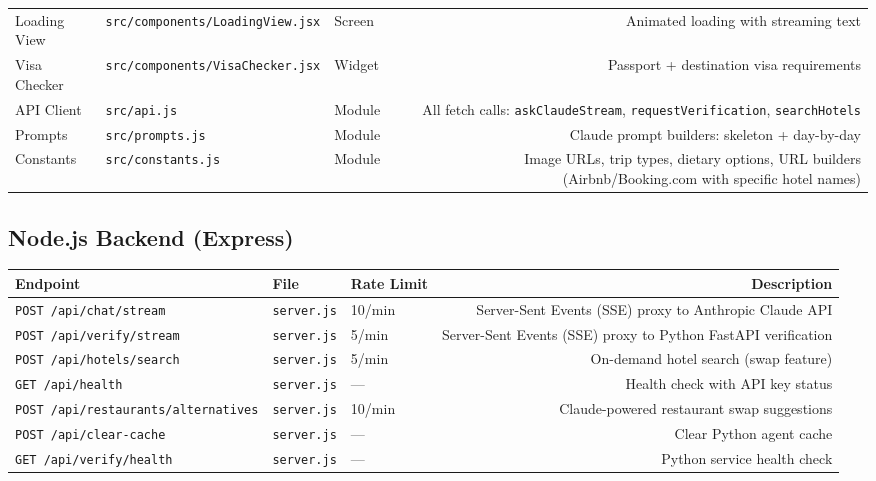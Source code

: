 \documentclass[11pt,a4paper]{article}
\begin{document}
{\begin{tabularx}{\textwidth}{@{}L{2.6cm}L{3.8cm}L{1.4cm}R@{}}
Loading View     & \texttt{src/components/\allowbreak LoadingView.jsx} & Screen   & Animated loading with streaming text \\[4pt]
Visa Checker     & \texttt{src/components/\allowbreak VisaChecker.jsx} & Widget   & Passport + destination visa requirements \\[4pt]
API Client       & \texttt{src/api.js}             & Module   & All fetch calls: \texttt{askClaudeStream}, \texttt{requestVerification}, \texttt{searchHotels} \\[4pt]
Prompts          & \texttt{src/prompts.js}          & Module   & Claude prompt builders: skeleton + day-by-day \\[4pt]
Constants        & \texttt{src/constants.js}         & Module   & Image URLs, trip types, dietary options, URL builders (Airbnb/Booking.com with specific hotel names) \\
\bottomrule
\end{tabularx}}

\subsection{Node.js Backend (Express)}

{\small
\begin{tabularx}{\textwidth}{@{}L{3.8cm}L{2.4cm}L{2cm}R@{}}
\toprule
\textbf{Endpoint} & \textbf{File} & \textbf{Rate Limit} & \textbf{Description} \\
\midrule
\texttt{POST /api/chat/\allowbreak stream} & \texttt{server.js} & 10/min & Server-Sent Events (SSE) proxy to Anthropic Claude API \\[4pt]
\texttt{POST /api/verify/\allowbreak stream} & \texttt{server.js} & 5/min & Server-Sent Events (SSE) proxy to Python FastAPI verification \\[4pt]
\texttt{POST /api/hotels/\allowbreak search} & \texttt{server.js} & 5/min & On-demand hotel search (swap feature) \\[4pt]
\texttt{GET /api/health} & \texttt{server.js} & --- & Health check with API key status \\[4pt]
\texttt{POST /api/restaurants/\allowbreak alternatives} & \texttt{server.js} & 10/min & Claude-powered restaurant swap suggestions \\[4pt]
\texttt{POST /api/clear-cache} & \texttt{server.js} & --- & Clear Python agent cache \\[4pt]
\texttt{GET /api/verify/\allowbreak health} & \texttt{server.js} & --- & Python service health check \\
\bottomrule
\end{tabularx}}
\end{document}
